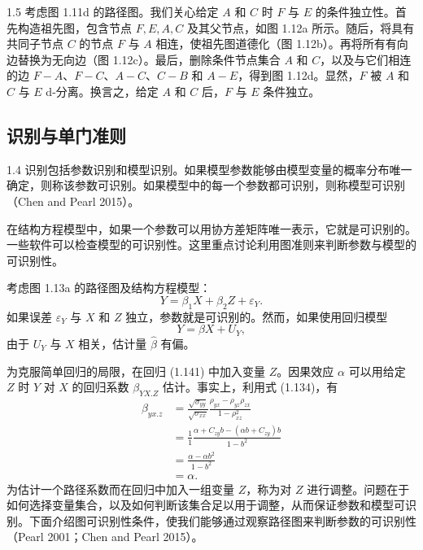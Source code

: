 \begin{bookexample}{1.5}
考虑图 1.11d 的路径图。我们关心给定 $A$ 和 $C$ 时 $F$ 与 $E$ 的条件独立性。首先构造祖先图，包含节点 $F,E,A,C$ 及其父节点，如图 1.12a 所示。随后，将具有共同子节点 $C$ 的节点 $F$ 与 $A$ 相连，使祖先图道德化（图 1.12b）。再将所有有向边替换为无向边（图 1.12c）。最后，删除条件节点集合 $A$ 和 $C$，以及与它们相连的边 $F-A$、$F-C$、$A-C$、$C-B$ 和 $A-E$，得到图 1.12d。显然，$F$ 被 $A$ 和 $C$ 与 $E$ d-分离。换言之，给定 $A$ 和 $C$ 后，$F$ 与 $E$ 条件独立。
\end{bookexample}


\FloatBarrier

\subsection{识别与单门准则}

\begin{bookdefinition}{1.4}
识别包括参数识别和模型识别。如果模型参数能够由模型变量的概率分布唯一确定，则称该参数可识别。如果模型中的每一个参数都可识别，则称模型可识别（Chen and Pearl 2015）。

在结构方程模型中，如果一个参数可以用协方差矩阵唯一表示，它就是可识别的。一些软件可以检查模型的可识别性。这里重点讨论利用图准则来判断参数与模型的可识别性。

考虑图 1.13a 的路径图及结构方程模型：
\begin{equation}
Y=\beta_1X+\beta_2Z+\varepsilon_Y.
\tag{1.140}
\end{equation}
如果误差 $\varepsilon_Y$ 与 $X$ 和 $Z$ 独立，参数就是可识别的。然而，如果使用回归模型
\begin{equation}
Y=\beta X+U_Y,
\tag{1.141}
\end{equation}
由于 $U_Y$ 与 $X$ 相关，估计量 $\widehat\beta$ 有偏。

为克服简单回归的局限，在回归 (1.141) 中加入变量 $Z$。因果效应 $\alpha$ 可以用给定 $Z$ 时 $Y$ 对 $X$ 的回归系数 $\beta_{YX.Z}$ 估计。事实上，利用式 (1.134)，有
\[
\begin{aligned}
\beta_{yx.z}
&=\frac{\sqrt{\sigma_{yy}}}{\sqrt{\sigma_{xx}}}
\frac{\rho_{yx}-\rho_{yz}\rho_{zx}}{1-\rho_{xz}^2}\\
&=\frac11\frac{\alpha+C_{zy}b-(\alpha b+C_{zy})b}{1-b^2}\\
&=\frac{\alpha-\alpha b^2}{1-b^2}\\
&=\alpha.
\end{aligned}
\]
为估计一个路径系数而在回归中加入一组变量 $Z$，称为对 $Z$ 进行调整。问题在于如何选择变量集合，以及如何判断该集合足以用于调整，从而保证参数和模型可识别。下面介绍图可识别性条件，使我们能够通过观察路径图来判断参数的可识别性（Pearl 2001；Chen and Pearl 2015）。
\end{bookdefinition}


